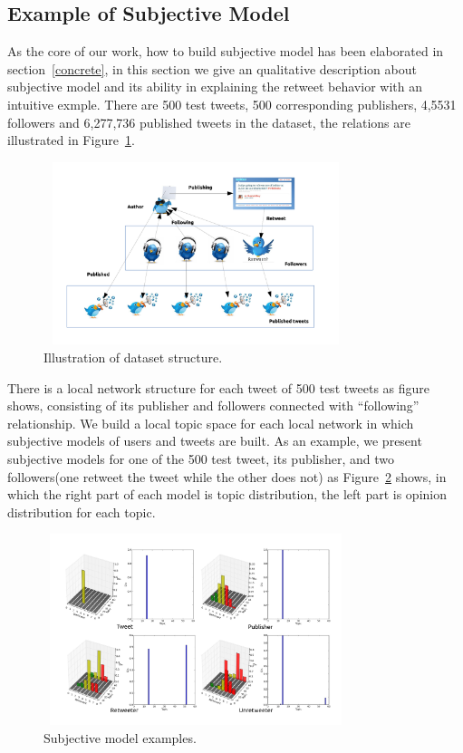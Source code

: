 \documentclass{acm_proc_article-sp}
\begin{document}
\subsection{Example of Subjective Model}
\label{example}
As the core of our work, how to build subjective model has been elaborated in section~\ref{concrete}, in this section we give an qualitative description about subjective model and its ability in explaining the retweet behavior with an intuitive exmple. 
There are 500 test tweets, 500 corresponding publishers, 4,5531 followers and 6,277,736 published tweets in the dataset, the relations are illustrated in Figure~\ref{fig:graph3}.
\begin{figure}[htb]
\centering%
\includegraphics[width=3.5in,height=2.1in]{dataset.pdf}
\caption{Illustration of dataset structure.}
\label{fig:graph3}
\end{figure}
There is a local network structure for each tweet of 500 test tweets as figure shows, consisting of its publisher and followers connected with ``following'' relationship.
We build a local topic space for each local network in which subjective models of users and tweets are built.
As an example, we present subjective models for one of the 500 test tweet, its publisher, and two followers(one retweet the tweet while the other does not) as Figure~\ref{fig:graph4} shows, in which the right part of each model is topic distribution, the left part is opinion distribution for each topic.
\begin{figure}[htb]
\centering%
\includegraphics[width=3.5in,height=2.2in]{tweets10.pdf}
\caption{Subjective model examples.}
\label{fig:graph4}
\end{figure}
\end{document}
